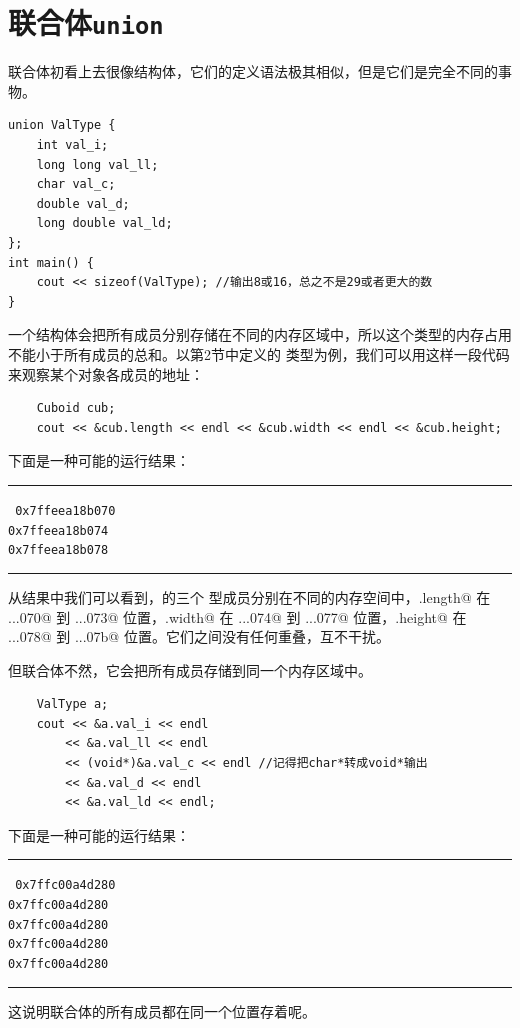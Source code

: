 \section{联合体\texttt{union}}
联合体初看上去很像结构体，它们的定义语法极其相似，但是它们是完全不同的事物。
\begin{lstlisting}
union ValType {
    int val_i;
    long long val_ll;
    char val_c;
    double val_d;
    long double val_ld;
};
int main() {
    cout << sizeof(ValType); //输出8或16，总之不是29或者更大的数
}
\end{lstlisting}\par
一个结构体会把所有成员分别存储在不同的内存区域中，所以这个类型的内存占用不能小于所有成员的总和。以第2节中定义的 \lstinline@Cuboid@ 类型为例，我们可以用这样一段代码来观察某个对象各成员的地址：
\begin{lstlisting}
    Cuboid cub;
    cout << &cub.length << endl << &cub.width << endl << &cub.height;
\end{lstlisting}
下面是一种可能的运行结果：\\\noindent\rule{\linewidth}{.2pt}\texttt{
0x7ffeea18b070\\
0x7ffeea18b074\\
0x7ffeea18b078
}\\\noindent\rule{\linewidth}{.2pt}\par
从结果中我们可以看到，\lstinline@cub@ 的三个 \lstinline@int@ 型成员分别在不同的内存空间中，\lstinline@cub.length@ 在 \lstinline@...070@ 到 \lstinline@...073@ 位置，\lstinline@cub.width@ 在 \lstinline@...074@ 到 \lstinline@...077@ 位置，\lstinline@cub.height@ 在 \lstinline@...078@ 到 \lstinline@...07b@ 位置。它们之间没有任何重叠，互不干扰。\par
但联合体不然，它会把所有成员存储到同一个内存区域中。
\begin{lstlisting}
    ValType a;
    cout << &a.val_i << endl
        << &a.val_ll << endl
        << (void*)&a.val_c << endl //记得把char*转成void*输出
        << &a.val_d << endl
        << &a.val_ld << endl;
\end{lstlisting}
下面是一种可能的运行结果：\\\noindent\rule{\linewidth}{.2pt}\texttt{
0x7ffc00a4d280\\
0x7ffc00a4d280\\
0x7ffc00a4d280\\
0x7ffc00a4d280\\
0x7ffc00a4d280
}\\\noindent\rule{\linewidth}{.2pt}
这说明联合体的所有成员都在同一个位置存着呢。\par
